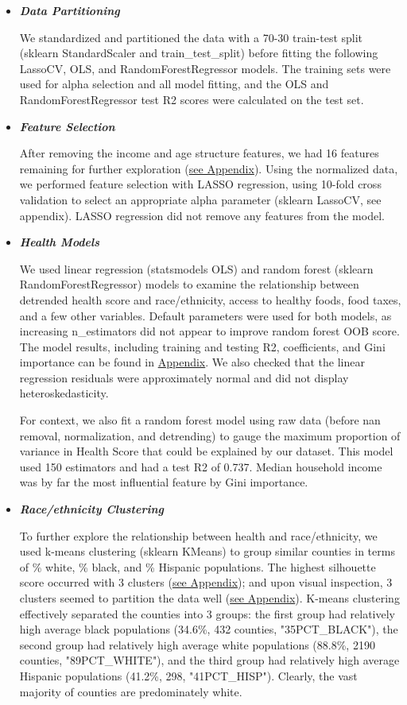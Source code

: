 \documentclass{article}
\begin{document}
\begin{itemize}[leftmargin=0pt]
\begin{itemize}
\item[] \textbf{\textit{Data Partitioning}}

We standardized and partitioned the data with a 70-30 train-test split (sklearn StandardScaler and train\_test\_split) before fitting the following LassoCV, OLS, and RandomForestRegressor models. The training sets were used for alpha selection and all model fitting, and the OLS and RandomForestRegressor test R2 scores were calculated on the test set.

\item[] \textbf{\textit{Feature Selection}}

After removing the income and age structure features, we had 16 features remaining for further exploration (\hyperref[fig:lassocv]{see Appendix}). Using the normalized data, we performed feature selection with LASSO regression, using 10-fold cross validation to select an appropriate alpha parameter (sklearn LassoCV, see appendix). LASSO regression did not remove any features from the model. 

\item[] \textbf{\textit{Health Models}}

We used linear regression (statsmodels OLS) and random forest (sklearn RandomForestRegressor) models to examine the relationship between detrended health score and race/ethnicity, access to healthy foods, food taxes, and a few other variables. Default parameters were used for both models, as increasing n\_estimators did not appear to improve random forest OOB score. The model results, including training and testing R2, coefficients, and Gini importance can be found in \hyperref[fig:statsmodelsOLS]{Appendix}. We also checked that the linear regression residuals were approximately normal and did not display heteroskedasticity.

For context, we also fit a random forest model using raw data (before nan removal, normalization, and detrending) to gauge the maximum proportion of variance in Health Score that could be explained by our dataset. This model used 150 estimators and had a test R2 of 0.737. Median household income was by far the most influential feature by Gini importance.

\item[] \textbf{\textit{Race/ethnicity Clustering}}

To further explore the relationship between health and race/ethnicity, we used k-means clustering (sklearn KMeans) to group similar counties in terms of \% white, \% black, and \% Hispanic populations. The highest silhouette score occurred with 3 clusters (\hyperref[fig:kmeans_scores]{see Appendix}); and upon visual inspection, 3 clusters seemed to partition the data well (\hyperref[fig:kmeans_pairplot]{see Appendix}). K-means clustering effectively separated the counties into 3 groups: the first group had relatively high average black populations (34.6\%, 432 counties, "35PCT\_BLACK"), the second group had relatively high average white populations (88.8\%, 2190 counties, "89PCT\_WHITE"), and the third group had relatively high average Hispanic populations (41.2\%, 298, "41PCT\_HISP"). Clearly, the vast majority of counties are predominately white. 


\end{itemize}
\end{itemize}
\end{document}
